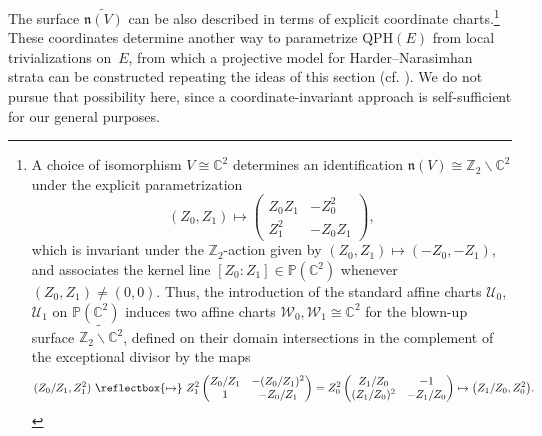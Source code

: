 \documentclass[10pt,a4paper]{amsart}
\newcommand{\field}[1]{\ensuremath{\mathbb{#1}}}
\newcommand{\CC}{\field{C}}
\newcommand{\PP}{\field{P}}
\newcommand{\ZZ}{\field{Z}}
\newcommand{\curly}[1]{\mathscr{#1}}
\newcommand{\cU}{\curly{U}}
\newcommand{\cW}{\curly{W}}
\numberwithin{equation}{section}
\begin{document}
\begin{Remark}%
The surface $\widetilde{\mathfrak{n}(V)}$ can be also described in terms of explicit coordinate charts.\footnote{A choice of isomorphism $V\cong \CC^{2}$ determines an identification $\mathfrak{n}(V)\cong \ZZ_{2}\backslash\CC^{2}$ under the explicit parametrization
\[
(Z_{0},Z_{1}) \mapsto \begin{pmatrix}
Z_{0}Z_{1} & -Z_{0}^{2}\\
Z_{1}^{2} & -Z_{0}Z_{1}
\end{pmatrix}\!,
\]
which is invariant under the $\ZZ_{2}$-action given by $(Z_{0},Z_{1})\mapsto (-Z_{0},-Z_{1})$, and associates the kernel line $[Z_{0} : Z_{1}]\in\PP(\CC^{2})$ whenever $(Z_{0},Z_{1})\neq(0,0)$. Thus, the introduction of the standard affine charts $\cU_{0}$, $\cU_{1}$ on $\PP(\CC^{2})$ induces two affine charts $\cW_{0},\cW_{1}\cong \CC^{2}$ for the blown-up surface $\widetilde{\ZZ_{2}\backslash\CC^{2}}$, defined on their domain intersections in the complement of the exceptional divisor by the maps
\[
(Z_{0}/Z_{1},Z_{1}^{2})\ \reflectbox{\ensuremath{\mapsto}} \
Z_{1}^{2}
\begin{pmatrix}
Z_{0}/Z_{1} & -(Z_{0}/Z_{1})^{2}\\
1 & -Z_{0}/Z_{1}
\end{pmatrix}
=Z_{0}^{2}\begin{pmatrix}
Z_{1}/Z_{0} & -1\\
(Z_{1}/Z_{0})^{2} & -Z_{1}/Z_{0}
\end{pmatrix}\mapsto \big(Z_{1}/Z_{0},Z_{0}^{2}\big).
\]
}
These coordinates determine another way to parametrize $\mathrm{QPH}(E)$ from local trivializations on~$E$, from which a projective model for Harder--Narasimhan strata can be constructed repeating the ideas of this section (cf. \cite{KS19}). We do not pursue that possibility here, since a coordinate-invariant approach is self-sufficient for our general purposes.
\end{Remark}
\end{document}
